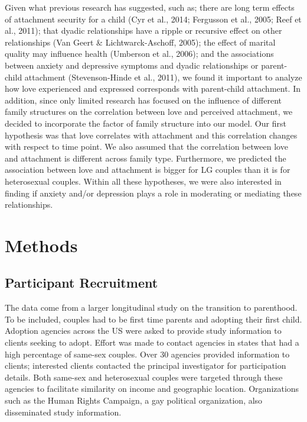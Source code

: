 \documentclass[man]{apa6}
\begin{document}
Given what previous research has suggested, such as; there are long term effects of attachment security for a child (Cyr et al., 2014; Fergusson et al., 2005; Reef et al., 2011); that dyadic relationships have a ripple or recursive effect on other relationships (Van Geert \& Lichtwarck-Aschoff, 2005); the effect of marital quality may influence health (Umberson et al., 2006); and the associations between anxiety and depressive symptoms and dyadic relationships or parent-child attachment (Stevenson-Hinde et al., 2011), we found it important to analyze how love experienced and expressed corresponds with parent-child attachment. In addition, since only limited research has focused on the influence of different family structures on the correlation between love and perceived attachment, we decided to incorporate the factor of family structure into our model. Our first hypothesis was that love correlates with attachment and this correlation changes with respect to time point. We also assumed that the correlation between love and attachment is different across family type. Furthermore, we predicted the association between love and attachment is bigger for LG couples than it is for heterosexual couples. Within all these hypotheses, we were also interested in finding if anxiety and/or depression plays a role in moderating or mediating these relationships.

\hypertarget{methods}{%
\section{Methods}\label{methods}}

\hypertarget{participant-recruitment}{%
\subsection{Participant Recruitment}\label{participant-recruitment}}

The data come from a larger longitudinal study on the transition to parenthood. To be included, couples had to be first time parents and adopting their first child. Adoption agencies across the US were asked to provide study information to clients seeking to adopt. Effort was made to contact agencies in states that had a high percentage of same-sex couples. Over 30 agencies provided information to clients; interested clients contacted the principal investigator for participation details. Both same-sex and heterosexual couples were targeted through these agencies to facilitate similarity on income and geographic location. Organizations such as the Human Rights Campaign, a gay political organization, also disseminated study information.
\end{document}

